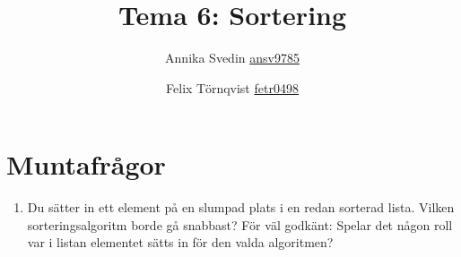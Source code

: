 \documentclass[a5paper,10pt,oneside]{article}
\title{Tema 6: Sortering}
\author{Annika Svedin \url{ansv9785} \and Felix Törnqvist \url{fetr0498}}
\begin{document}
\maketitle

\section*{Muntafrågor}

\begin{enumerate}
	\item Du sätter in ett element på en slumpad plats i en redan sorterad lista. Vilken sorteringsalgoritm borde gå snabbast?
		För väl godkänt: Spelar det någon roll var i listan elementet sätts in för den valda algoritmen?
	
	
	
	
\end{enumerate}
\end{document}
